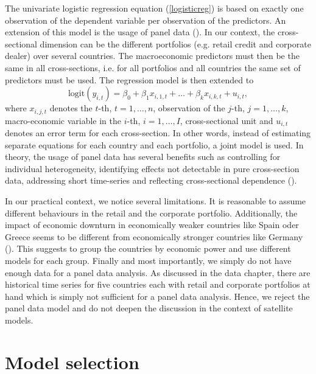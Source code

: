 \documentclass[a4paper, 11pt]{scrreprt}
\newcommand{\logit}{\mathrm{logit}}
\begin{document}
The univariate logistic regression equation (\ref{logisticreg}) is based on exactly one observation of the dependent variable per observation of the predictors. An extension of this model is the usage of panel data (\textcite[chapter 2]{baltagi2008panel}). 
In our context, the cross-sectional dimension can be the different portfolios (e.g. retail credit and corporate dealer) over several countries. The macroeconomic predictors must then be the same in all cross-sections, i.e. for all portfolios and all countries the same set of predictors must be used. 
The regression model is then extended to 
\begin{equation}\label{panel}
\logit(y_{i,t}) = \beta_0 + \beta_1 x_{i,1,t} + \ldots + \beta_k x_{i,k,t} + u_{i,t},
\end{equation}
where $x_{i,j,t}$ denotes the $t$-th, $t=1,\ldots,n$, observation of the $j$-th, $j=1,\ldots,k$, macro-economic variable in the $i$-th, $i=1,\ldots,I$, cross-sectional unit and $u_{i,t}$ denotes an error term for each cross-section.
In other words, instead of estimating separate equations for each country and each portfolio, a joint model is used. In theory, the usage of panel data has several benefits such as controlling for individual heterogeneity, identifying effects not detectable in pure cross-section data, addressing short time-series and reflecting cross-sectional dependence (\textcite[chapter 1.2]{baltagi2008panel}).

\bigskip

In our practical context, we notice several limitations. 
It is reasonable to assume different behaviours in the retail and the corporate portfolio. 
Additionally, the impact of economic downturn in economically weaker countries like Spain oder Greece seems to be different from economically stronger countries like Germany (\textcite[p. 112]{wilson1997wilsonI}). This suggests to group the countries by economic power and use different models for each group.
Finally and most importantly, we simply do not have enough data for a panel data analysis. As discussed in the data chapter, there are historical time series for five countries each with retail and corporate portfolios at hand which is simply not sufficient for a panel data analysis. 
Hence, we reject the panel data model and do not deepen the discussion in the context of satellite models.

\pagebreak

\section{Model selection}\label{section:modelselection}
\end{document}
